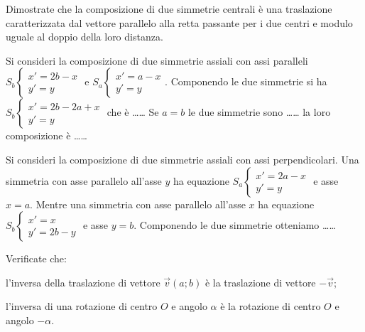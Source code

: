 \begin{esercizio}
\label{ese:8.79} %
Dimostrate che la composizione di due simmetrie centrali è una 
traslazione caratterizzata dal vettore parallelo alla retta passante 
per i due centri e modulo uguale al doppio della loro distanza.
\end{esercizio}

\begin{esercizio}
\label{ese:8.80} %
Si consideri la composizione di due simmetrie assiali con assi 
paralleli $S_b\begin{cases}x'=2b-x\\y'=y\end{cases}$ e 
$S_a\begin{cases}x'=a-x\\y'=y\end{cases}$.
Componendo le due simmetrie si ha 
$S_b\begin{cases}x'=2b-2a+x\\y'=y\end{cases}$ che è \ldots\ldots{}
Se $a=b$ le due simmetrie sono \ldots\ldots{} la loro composizione è 
\ldots\dots{}
\end{esercizio}

\begin{esercizio}
\label{ese:8.81} %
Si consideri la composizione di due simmetrie assiali con assi 
perpendicolari.
Una simmetria con asse parallelo all'asse $y$ ha equazione 
$S_a\begin{cases}x'=2a-x\\y'=y\end{cases}$ e asse $x = a$.
Mentre una simmetria con asse parallelo all'asse $x$ ha equazione 
$S_b\begin{cases}x'=x\\y'=2b-y\end{cases}$ e asse $y = b$.
Componendo le due simmetrie otteniamo \ldots\ldots{}
\end{esercizio}

\begin{esercizio}
\label{ese:8.82} %
Verificate che:
\begin{enumeratea}
\item l'inversa della traslazione di vettore $\vec{v}(a;b)$ è la 
traslazione di vettore $-\vec{v}$;
\item l'inversa di una rotazione di centro $O$ e angolo $\alpha$ è la 
rotazione di centro $O$ e angolo $-\alpha$.
\end{enumeratea}
\end{esercizio}

